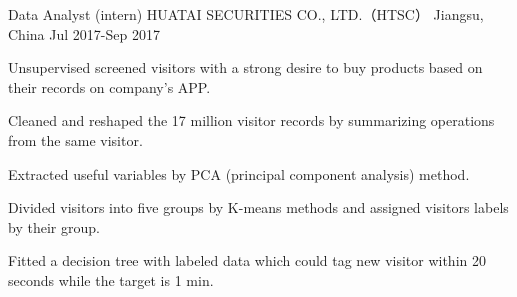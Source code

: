\begin{cventries}
  \cventry
    {Data Analyst (intern)} %
    {HUATAI SECURITIES CO., LTD.（HTSC）} %
    {Jiangsu, China} %
    {Jul 2017-Sep 2017} %
    {
      \begin{cvitems} %
        \item {Unsupervised screened visitors with a strong desire to buy products based on their records on company’s APP.}
        \item {Cleaned and reshaped the 17 million visitor records by summarizing operations from the same visitor.}
        \item {Extracted useful variables by PCA (principal component analysis) method.}
        \item {Divided visitors into five groups by K-means methods and assigned visitors labels by their group.}
        \item {Fitted a decision tree with labeled data which could tag new visitor within 20 seconds while the target is 1 min.}
      \end{cvitems}
    }



\end{cventries}
